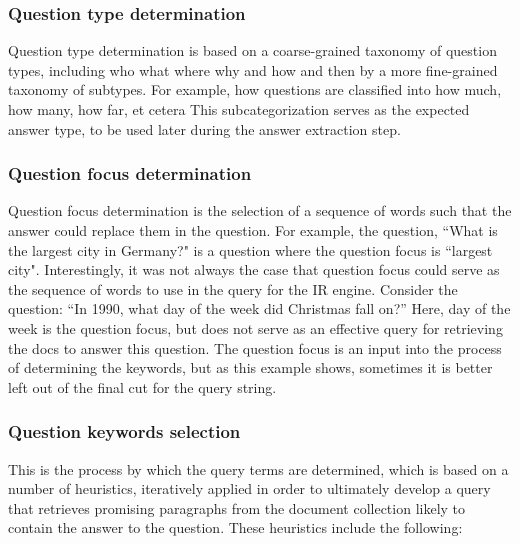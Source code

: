 \subsubsection{Question type determination}

Question type determination is based on a coarse-grained taxonomy of question types, including who what where why and how and then by a more fine-grained taxonomy of subtypes.  For example, how questions are classified into how much, how many, how far, et cetera  This subcategorization serves as the expected answer type, to be used later during the answer extraction step.

\subsubsection{Question focus determination}

Question focus determination is the selection of a sequence of words such that the answer could replace them in the question.  For example, the question, ``What is the largest city in Germany?" is a question where the question focus is ``largest city".  Interestingly, it was not always the case that question focus could serve as the sequence of words to use in the query for the IR engine.   Consider the question: ``In 1990, what day of the week did Christmas fall on?”  Here, day of the week is the question focus, but does not serve as an effective query for retrieving the docs to answer this question.  The question focus is an input into the process of determining the keywords, but as this example shows, sometimes it is better left out of the final cut for the query string.

\subsubsection{Question keywords selection}

This is the process by which the query terms are determined, which is based on a number of heuristics, iteratively applied in order to ultimately develop a query that retrieves promising paragraphs from the document collection likely to contain the answer to the question.  These heuristics include the following:

